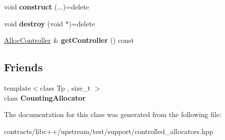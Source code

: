 \begin{DoxyCompactItemize}
void {\bfseries construct} (...)=delete
\item 
\mbox{\label{class_counting_allocator_3_01void_00_01_i_d_01_4_abfcfda97e23176516aa3dc4765b861d3}} 
void {\bfseries destroy} (void $\ast$)=delete
\item 
\mbox{\label{class_counting_allocator_3_01void_00_01_i_d_01_4_a75f3b882e6fe059ac8b8fbaefffeee89}} 
\mbox{\hyperlink{struct_alloc_controller}{Alloc\+Controller}} \& {\bfseries get\+Controller} () const
\end{DoxyCompactItemize}
\subsection*{Friends}
\begin{DoxyCompactItemize}
\item 
\mbox{\label{class_counting_allocator_3_01void_00_01_i_d_01_4_a9bd3e3072fa25d4552e216a50089ffb7}} 
{\footnotesize template$<$class Tp , size\+\_\+t $>$ }\\class {\bfseries Counting\+Allocator}
\end{DoxyCompactItemize}


The documentation for this class was generated from the following file\+:\begin{DoxyCompactItemize}
\item 
contracts/libc++/upstream/test/support/controlled\+\_\+allocators.\+hpp\end{DoxyCompactItemize}
